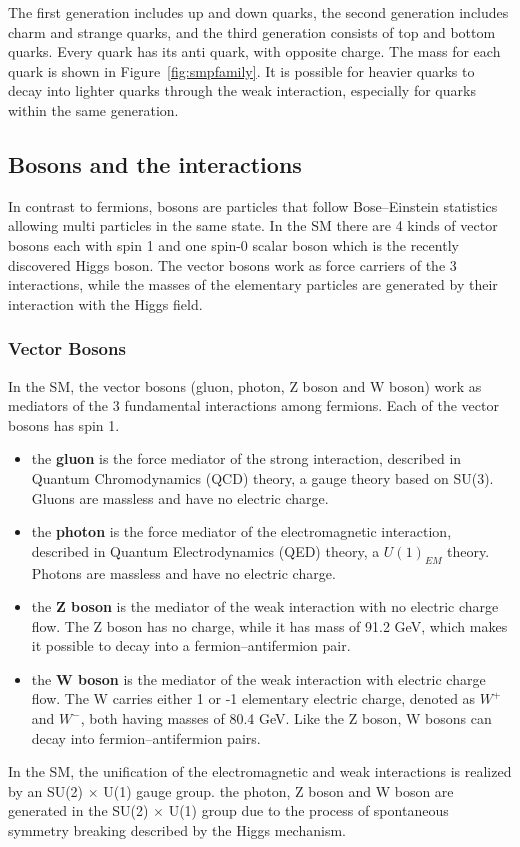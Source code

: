 \vspace{0.3cm}
The first generation includes up and down quarks, the second generation includes charm and strange quarks, and the third generation consists of top and bottom quarks. Every quark has its anti quark, with opposite charge. The mass for each quark is shown in Figure~\ref{fig:smpfamily}. It is possible for heavier quarks to decay into lighter quarks through the weak interaction, especially for quarks within the same generation.
\subsection{Bosons and the interactions}
In contrast to fermions, bosons are particles that follow Bose–Einstein statistics allowing multi particles in the same state. In the SM there are 4 kinds of vector bosons each with spin 1 and one spin-0 scalar boson which is the recently discovered Higgs boson. The vector bosons work as force carriers of the 3 interactions, while the masses of the elementary particles are generated by their interaction with the Higgs field.
\subsubsection{Vector Bosons}
In the SM, the vector bosons (gluon, photon, Z boson and W boson) work as mediators of the 3 fundamental interactions among fermions. Each of the vector bosons has spin 1.
\begin{itemize}
\item the \textbf{gluon} is the force mediator of the strong interaction, described in Quantum Chromodynamics (QCD) theory, a gauge theory based on SU(3). Gluons are massless and have no electric charge.
\item the \textbf{photon} is the force mediator of the electromagnetic interaction, described in Quantum Electrodynamics (QED) theory, a $U(1)_{EM}$ theory. Photons are massless and have no electric charge.
\item the \textbf{Z boson} is the mediator of the weak interaction with no electric charge flow. The Z boson has no charge, while it has mass of 91.2 GeV, which makes it possible to decay into a fermion–antifermion pair.
\item the \textbf{W boson} is the mediator of the weak interaction with electric charge flow. The W carries either 1 or -1 elementary electric charge, denoted as $W^{+}$ and $W^{-}$, both having masses of 80.4 GeV. Like the Z boson, W bosons can decay into fermion–antifermion pairs.
\end{itemize}
In the SM, the unification of the electromagnetic and weak interactions is realized by an SU(2) $\times$ U(1) gauge group. the photon, Z boson and W boson are generated in the SU(2) $\times$ U(1) group due to the process of spontaneous symmetry breaking described by the Higgs mechanism. 
